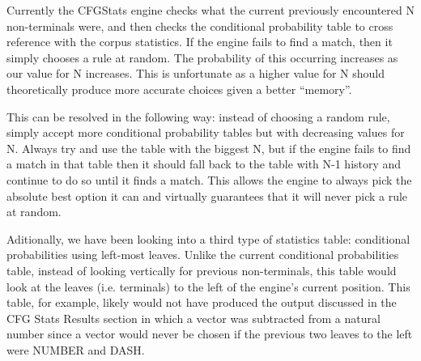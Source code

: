 Currently the CFGStats engine checks what the current previously encountered N
non-terminals were, and then checks the conditional probability table to cross
reference with the corpus statistics. If the engine fails to find a match, then
it simply chooses a rule at random. The probability of this occurring increases
as our value for N increases. This is unfortunate as a higher value for N
should theoretically produce more accurate choices given a better ``memory''.

This can be resolved in the following way: instead of choosing a random rule,
simply accept more conditional probability tables but with decreasing values
for N. Always try and use the table with the biggest N, but if the engine fails
to find a match in that table then it should fall back to the table with N-1
history and continue to do so until it finds a match. This allows the engine to
always pick the absolute best option it can and virtually guarantees that it
will never pick a rule at random.

Aditionally, we have been looking into a third type of statistics table:
conditional probabilities using left-most leaves. Unlike the current
conditional probabilities table, instead of looking vertically for previous
non-terminals, this table would look at the leaves (i.e. terminals) to the left
of the engine's current position. This table, for example, likely would not
have produced the output discussed in the CFG Stats Results section in which a
vector was subtracted from a natural number since a vector would never be
chosen if the previous two leaves to the left were NUMBER and DASH.

